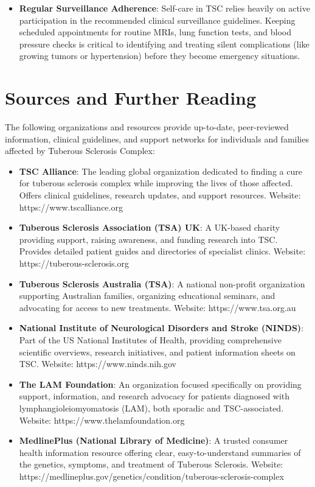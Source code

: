 \begin{itemize}
    \item \textbf{Regular Surveillance Adherence}: Self-care in TSC relies heavily on active participation in the recommended clinical surveillance guidelines. Keeping scheduled appointments for routine MRIs, lung function tests, and blood pressure checks is critical to identifying and treating silent complications (like growing tumors or hypertension) before they become emergency situations.
\end{itemize}

\section*{Sources and Further Reading}
The following organizations and resources provide up-to-date, peer-reviewed information, clinical guidelines, and support networks for individuals and families affected by Tuberous Sclerosis Complex:
\begin{itemize}
    \item \textbf{TSC Alliance}: The leading global organization dedicated to finding a cure for tuberous sclerosis complex while improving the lives of those affected. Offers clinical guidelines, research updates, and support resources. Website: https://www.tscalliance.org
    \item \textbf{Tuberous Sclerosis Association (TSA) UK}: A UK-based charity providing support, raising awareness, and funding research into TSC. Provides detailed patient guides and directories of specialist clinics. Website: https://tuberous-sclerosis.org
    \item \textbf{Tuberous Sclerosis Australia (TSA)}: A national non-profit organization supporting Australian families, organizing educational seminars, and advocating for access to new treatments. Website: https://www.tsa.org.au
    \item \textbf{National Institute of Neurological Disorders and Stroke (NINDS)}: Part of the US National Institutes of Health, providing comprehensive scientific overviews, research initiatives, and patient information sheets on TSC. Website: https://www.ninds.nih.gov
    \item \textbf{The LAM Foundation}: An organization focused specifically on providing support, information, and research advocacy for patients diagnosed with lymphangioleiomyomatosis (LAM), both sporadic and TSC-associated. Website: https://www.thelamfoundation.org
    \item \textbf{MedlinePlus (National Library of Medicine)}: A trusted consumer health information resource offering clear, easy-to-understand summaries of the genetics, symptoms, and treatment of Tuberous Sclerosis. Website: https://medlineplus.gov/genetics/condition/tuberous-sclerosis-complex
\end{itemize}